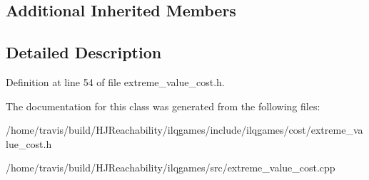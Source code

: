 \subsection*{Additional Inherited Members}


\subsection{Detailed Description}


Definition at line 54 of file extreme\+\_\+value\+\_\+cost.\+h.



The documentation for this class was generated from the following files\+:\begin{DoxyCompactItemize}
\item 
/home/travis/build/\+H\+J\+Reachability/ilqgames/include/ilqgames/cost/extreme\+\_\+value\+\_\+cost.\+h\item 
/home/travis/build/\+H\+J\+Reachability/ilqgames/src/extreme\+\_\+value\+\_\+cost.\+cpp\end{DoxyCompactItemize}
